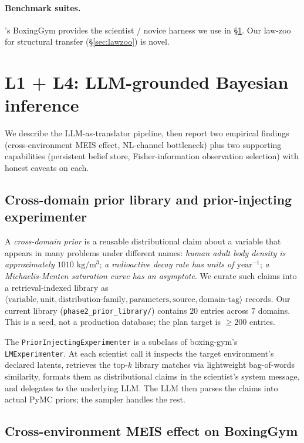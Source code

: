 \documentclass{article}
\begin{document}
\paragraph{Benchmark suites.}
\citet{li2025boxinggym}'s BoxingGym provides the scientist / novice
harness we use in \S\ref{sec:llm-grounded}. Our law-zoo for
structural transfer (\S\ref{sec:lawzoo}) is novel.

\section{L1 + L4: LLM-grounded Bayesian inference}
\label{sec:llm-grounded}

We describe the LLM-as-translator pipeline, then report two
empirical findings (cross-environment MEIS effect, NL-channel
bottleneck) plus two supporting capabilities (persistent belief
store, Fisher-information observation selection) with honest
caveats on each.

\subsection{Cross-domain prior library and prior-injecting experimenter}
\label{sec:prior-library}

A \emph{cross-domain prior} is a reusable distributional claim
about a variable that appears in many problems under different
names: \emph{human adult body density is approximately
$1010$ $\mathrm{kg}/\mathrm{m}^{3}$}; \emph{a radioactive decay
rate has units of $\mathrm{year}^{-1}$}; \emph{a Michaelis-Menten
saturation curve has an asymptote}. We curate such claims into a
retrieval-indexed library as $\langle \text{variable}, \text{unit},
\text{distribution-family}, \text{parameters}, \text{source},
\text{domain-tag} \rangle$ records. Our current library
(\texttt{phase2\_prior\_library/}) contains $20$ entries across
$7$ domains. This is a seed, not a production database; the plan
target is $\geq 200$ entries.

The \texttt{PriorInjectingExperimenter} is a subclass of
boxing-gym's \texttt{LMExperimenter}. At each scientist call it
inspects the target environment's declared latents, retrieves the
top-$k$ library matches via lightweight bag-of-words similarity,
formats them as distributional claims in the scientist's system
message, and delegates to the underlying LLM. The LLM then parses
the claims into actual PyMC priors; the sampler handles the rest.

\subsection{Cross-environment MEIS effect on BoxingGym}
\label{sec:exp-crossenv}
\end{document}
